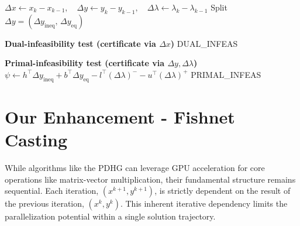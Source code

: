 \documentclass[twoside,12pt,openright]{report}  %
\begin{document}

\begin{algorithm}[H]
\caption{InfeasibilityDetection($x_k,y_k,\lambda_k,x_{k-1},y_{k-1},\lambda_{k-1},tol$)}
\begin{algorithmic}[1]
\State $\Delta x \gets x_k-x_{k-1},\quad \Delta y \gets y_k-y_{k-1},\quad \Delta\lambda \gets \lambda_k-\lambda_{k-1}$
\State Split $\Delta y=(\Delta y_{\mathrm{ineq}},\,\Delta y_{\mathrm{eq}})$

\State \textbf{Dual-infeasibility test (certificate via $\Delta x$)}
    \State \Return \textsc{DUAL\_INFEAS}
\EndIf

\State \textbf{Primal-infeasibility test (certificate via $\Delta y,\Delta\lambda$)}
    \State $\psi \gets h^\top\Delta y_{\mathrm{ineq}} + b^\top\Delta y_{\mathrm{eq}} - l^\top(\Delta\lambda)^- - u^\top(\Delta\lambda)^+$
        \State \Return \textsc{PRIMAL\_INFEAS}
    \EndIf
\EndIf
\end{algorithmic}
\end{algorithm}

\section{Our Enhancement - Fishnet Casting} \label{sec:Fishnet}
While algorithms like the PDHG can leverage GPU acceleration for core operations like matrix-vector multiplication, their fundamental structure remains sequential. Each iteration, $(x^{k+1}, y^{k+1})$, is strictly dependent on the result of the previous iteration, $(x^k, y^k)$. This inherent iterative dependency limits the parallelization potential within a single solution trajectory. 
\end{document}
